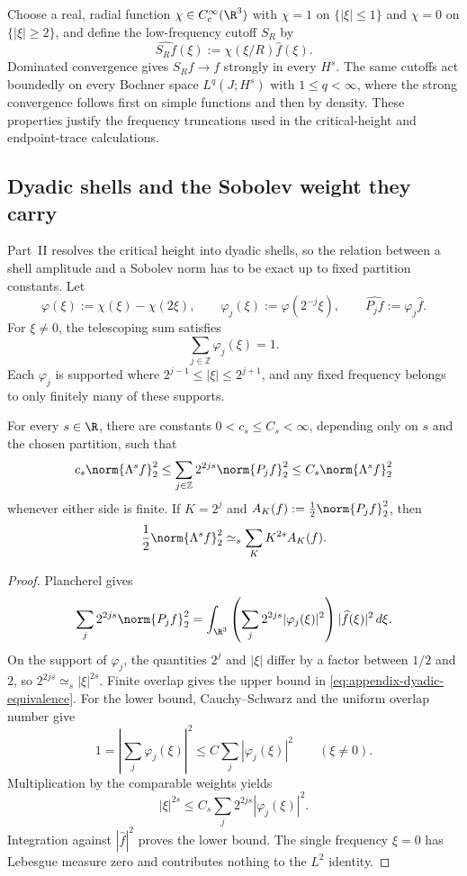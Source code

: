 Choose a real, radial function \(\chi\in C_c^\infty(\R^3)\) with \(\chi=1\) on \(\{|\xi|\le1\}\) and \(\chi=0\) on \(\{|\xi|\ge2\}\), and define the low-frequency cutoff \(S_R\) by
\[
 \widehat{S_Rf}(\xi):=\chi(\xi/R)\widehat f(\xi).
\]
Dominated convergence gives \(S_Rf\to f\) strongly in every \(H^s\).
The same cutoffs act boundedly on every Bochner space \(L^q(J;H^s)\) with \(1\le q<\infty\), where the strong convergence follows first on simple functions and then by density.
These properties justify the frequency truncations used in the critical-height and endpoint-trace calculations.

\subsection{Dyadic shells and the Sobolev weight they carry}

Part~II resolves the critical height into dyadic shells, so the relation between a shell amplitude and a Sobolev norm has to be exact up to fixed partition constants.
Let
\[
 \varphi(\xi):=\chi(\xi)-\chi(2\xi),
 \qquad
 \varphi_j(\xi):=\varphi(2^{-j}\xi),
 \qquad
 \widehat{P_jf}:=\varphi_j\widehat f.
\]
For \(\xi\ne0\), the telescoping sum satisfies
\[
 \sum_{j\in\mathbb Z}\varphi_j(\xi)=1.
\]
Each \(\varphi_j\) is supported where \(2^{j-1}\le|\xi|\le2^{j+1}\), and any fixed frequency belongs to only finitely many of these supports.

\begin{lemma}
For every \(s\in\R\), there are constants \(0<c_s\le C_s<\infty\), depending only on \(s\) and the chosen partition, such that
\begin{equation}
 c_s\norm{\Lambda^sf}_2^2
 \le\sum_{j\in\mathbb Z}2^{2js}\norm{P_jf}_2^2
 \le C_s\norm{\Lambda^sf}_2^2
 \label{eq:appendix-dyadic-equivalence}
\end{equation}
whenever either side is finite.
If \(K=2^j\) and \(A_K(f):=\frac12\norm{P_jf}_2^2\), then
\[
 \frac12\norm{\Lambda^sf}_2^2\simeq_s\sum_KK^{2s}A_K(f).
\]
\end{lemma}

\begin{proof}
Plancherel gives
\[
 \sum_j2^{2js}\norm{P_jf}_2^2
 =\int_{\R^3}
 \left(\sum_j2^{2js}|\varphi_j(\xi)|^2\right)
 |\widehat f(\xi)|^2\,d\xi.
\]
On the support of \(\varphi_j\), the quantities \(2^j\) and \(|\xi|\) differ by a factor between \(1/2\) and \(2\), so \(2^{2js}\simeq_s|\xi|^{2s}\).
Finite overlap gives the upper bound in \eqref{eq:appendix-dyadic-equivalence}.
For the lower bound, Cauchy--Schwarz and the uniform overlap number give
\[
 1=\left|\sum_j\varphi_j(\xi)\right|^2
 \le C\sum_j|\varphi_j(\xi)|^2
 \qquad(\xi\ne0).
\]
Multiplication by the comparable weights yields
\[
 |\xi|^{2s}\le C_s\sum_j2^{2js}|\varphi_j(\xi)|^2.
\]
Integration against \(|\widehat f|^2\) proves the lower bound.
The single frequency \(\xi=0\) has Lebesgue measure zero and contributes nothing to the \(L^2\) identity.
\end{proof}

